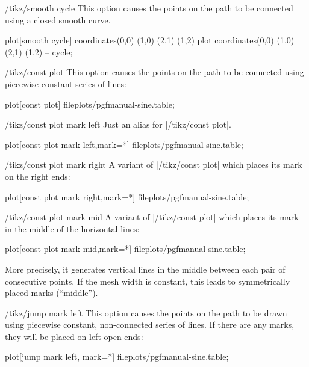 \begin{key}{/tikz/smooth cycle}
  This option causes the points on the path to be connected using a
  closed smooth curve.

\begin{codeexample}[]
\tikz[scale=0.5]
  \draw plot[smooth cycle] coordinates{(0,0) (1,0) (2,1) (1,2)}
        plot               coordinates{(0,0) (1,0) (2,1) (1,2)} -- cycle;
\end{codeexample}
\end{key}

\begin{key}{/tikz/const plot}
  This option causes the points on the path to be connected using piecewise constant series of lines:

\begin{codeexample}[]
\tikz\draw plot[const plot] file{plots/pgfmanual-sine.table};
\end{codeexample}
\end{key}

\begin{key}{/tikz/const plot mark left}
  Just an alias for |/tikz/const plot|.
\begin{codeexample}[]
\tikz\draw plot[const plot mark left,mark=*] file{plots/pgfmanual-sine.table};
\end{codeexample}
\end{key}

\begin{key}{/tikz/const plot mark right}
  A variant of |/tikz/const plot| which places its mark on the right ends:
\begin{codeexample}[]
\tikz\draw plot[const plot mark right,mark=*] file{plots/pgfmanual-sine.table};
\end{codeexample}
\end{key}

\begin{key}{/tikz/const plot mark mid}
  A variant of |/tikz/const plot| which places its mark in the middle of the horizontal lines:
\begin{codeexample}[]
\tikz\draw plot[const plot mark mid,mark=*] file{plots/pgfmanual-sine.table};
\end{codeexample}
	More precisely, it generates vertical lines in the middle between each pair of consecutive points. If the mesh width is constant, this leads to symmetrically placed marks (``middle'').
\end{key}


\begin{key}{/tikz/jump mark left}
  This option causes the points on the path to be drawn using piecewise constant, non-connected series of lines. If there are any marks, they will be placed on left open ends:

\begin{codeexample}[]
\tikz\draw plot[jump mark left, mark=*] file{plots/pgfmanual-sine.table};
\end{codeexample}
\end{key}

